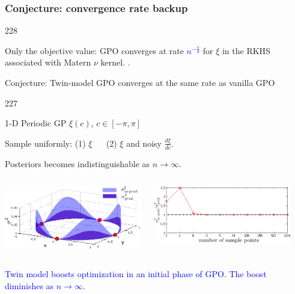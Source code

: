 \documentclass{beamer}
\let\oldcite=\cite
\renewcommand{\cite}[1]{\textcolor[rgb]{.4,.4,.85}{\oldcite{#1}}}
\newcommand{\barrow}{\item[\color{darkred}\ding{228}]}
\newcommand{\carrow}{\item[\color{darkred}\ding{227}]}
\begin{document}
\begin{frame}
    \frametitle{Conjecture: convergence rate \hfill \scriptsize{backup}}\small
    \begin{dinglist}{228}
    \barrow
    Only the objective value: GPO converges at rate
    \textcolor{blue}{$n^{-\frac{\nu}{d}}$} for $\xi$ in the RKHS associated with Matern $\nu$ kernel.
    \scriptsize\cite{Bull 11}\small.
    \barrow Conjecture: Twin-model GPO converges at the same rate as vanilla GPO 
        \begin{dinglist}{227}
            \carrow 1-D Periodic GP $\xi(c)$, $c\in [-\pi, \pi]$
            \carrow Sample uniformly: (1) $\xi$ $\quad$ (2) $\xi$ and noisy $\frac{d \xi}{dc}$.
            \carrow Posteriors becomes indistinguishable as $n\rightarrow \infty$.
        \end{dinglist}
    \begin{columns}
        \begin{center}
            \includegraphics[width=6cm]{circle_var_sketch.png}
        \end{center}
        \begin{center}
            \includegraphics[width=6cm]{var_ratio.png}
        \end{center}
    \end{columns}
    \barrow \textcolor{blue}{Twin model boosts optimization in an initial phase of GPO. The boost
    diminishes as $n\rightarrow \infty$}.
    \end{dinglist}
\end{frame}
\end{document}
